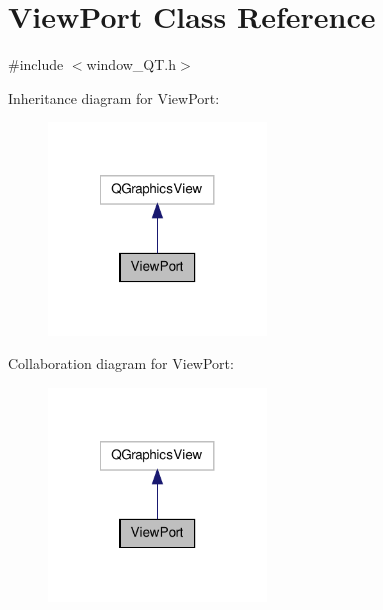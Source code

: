 \hypertarget{classViewPort}{\section{View\-Port Class Reference}
\label{classViewPort}
}


{\ttfamily \#include $<$window\-\_\-\-Q\-T.\-h$>$}



Inheritance diagram for View\-Port\-:
\nopagebreak
\begin{figure}[H]
\begin{center}
\leavevmode
\includegraphics[width=164pt]{classViewPort__inherit__graph}
\end{center}
\end{figure}


Collaboration diagram for View\-Port\-:
\nopagebreak
\begin{figure}[H]
\begin{center}
\leavevmode
\includegraphics[width=164pt]{classViewPort__coll__graph}
\end{center}
\end{figure}
